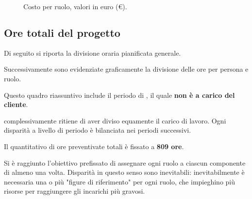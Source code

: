 \begin{figure}[H]
\label{tab:cvv}

  \caption{Costo {\VV} per ruolo, valori in euro (\euro).}
\end{figure}

\pagebreak[4]

\subsection{Ore totali del progetto}
Di seguito si riporta la divisione oraria pianificata generale.

Successivamente sono evidenziate graficamente la divisione delle ore per persona e ruolo.

Questo quadro riassuntivo include il periodo di {\AR}, il quale \textbf{non è a carico del cliente}.

{\hx} complessivamente ritiene di aver diviso equamente il carico di lavoro. Ogni disparità a livello di periodo è bilanciata nei periodi successivi. 

Il quantitativo di ore preventivate totali è fissato a \textbf{809 ore}.

Si è raggiunto l'obiettivo prefissato di assegnare ogni ruolo a ciascun componente di {\hx} almeno una volta. Disparità in questo senso sono inevitabili: inevitabilmente è necessaria una o più "figure di riferimento" per ogni ruolo, che impieghino più risorse per raggiungere gli incarichi più gravosi.


